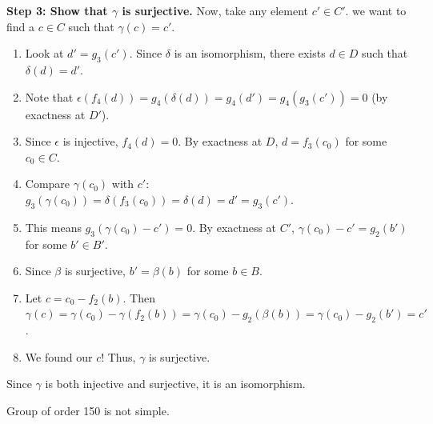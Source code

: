 \begin{solution}
\textbf{Step 3: Show that $\gamma$ is surjective.}
Now, take any element $c' \in C'$. we want to find a $c \in C$ such that $\gamma(c) = c'$.
\begin{enumerate}
    \item Look at $d' = g_3(c')$. Since $\delta$ is an isomorphism, there exists $d \in D$ such that $\delta(d) = d'$.
    \item Note that $\epsilon(f_4(d)) = g_4(\delta(d)) = g_4(d') = g_4(g_3(c')) = 0$ (by exactness at $D'$).
    \item Since $\epsilon$ is injective, $f_4(d) = 0$. By exactness at $D$, $d = f_3(c_0)$ for some $c_0 \in C$.
    \item Compare $\gamma(c_0)$ with $c'$: $g_3(\gamma(c_0)) = \delta(f_3(c_0)) = \delta(d) = d' = g_3(c')$.
    \item This means $g_3(\gamma(c_0) - c') = 0$. By exactness at $C'$, $\gamma(c_0) - c' = g_2(b')$ for some $b' \in B'$.
    \item Since $\beta$ is surjective, $b' = \beta(b)$ for some $b \in B$.
    \item Let $c = c_0 - f_2(b)$. Then $\gamma(c) = \gamma(c_0) - \gamma(f_2(b)) = \gamma(c_0) - g_2(\beta(b)) = \gamma(c_0) - g_2(b') = c'$.
    \item We found our $c$! Thus, $\gamma$ is surjective.
\end{enumerate}
Since $\gamma$ is both injective and surjective, it is an isomorphism.
\end{solution}

\begin{exercise}
\label{algebra:2011:6}
Group of order 150 is not simple.
\end{exercise}

